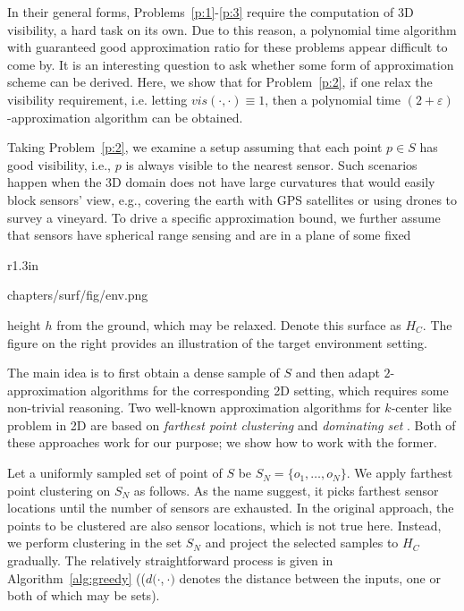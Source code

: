 
In their general forms, Problems~\ref{p:1}-\ref{p:3} require the computation of 3D visibility, a hard task on its own. Due to this reason, a polynomial time algorithm with guaranteed good approximation ratio for these problems appear difficult to come by. It is an interesting question to ask whether some form of approximation scheme can be derived. Here, we show that for Problem~\ref{p:2}, if one relax the visibility requirement, i.e. letting $vis(\cdot, \cdot)\equiv 1$, then a polynomial time $(2+\varepsilon)$-approximation algorithm can be obtained. 

Taking Problem~\ref{p:2}, we examine a setup assuming that each point $p \in S$ has good visibility, i.e., $p$ is always visible to the nearest sensor. Such scenarios happen when the 3D domain does not have large curvatures that would easily block sensors' view, e.g., covering the earth with GPS satellites or using drones to survey a vineyard. To drive a specific approximation bound, 
we further assume that sensors have spherical range sensing and are in a plane of some fixed 
\begin{wrapfigure}[5]{r}{1.3in}
  \vspace*{0mm}
  \begin{overpic}[width=1.3in,tics=5]{chapters/surf/fig/env.png}
	\end{overpic}
\vspace*{-6.5mm}
\end{wrapfigure}
height $h$ from the ground, which may be relaxed. Denote this surface as $H_C$. 
The figure on the right provides an illustration of the target environment setting. 

The main idea is to first obtain a dense sample of $S$ and then adapt $2$-approximation algorithms for the corresponding 2D setting, which requires some non-trivial reasoning. Two well-known approximation algorithms for $k$-center like problem in 2D are based on \emph{farthest point clustering} \cite{gonzalez1985clustering} and \emph{dominating set} \cite{hochbaum1985best, vazirani2013approximation}. Both of these approaches work for our purpose; we show how to work with the former.

Let a uniformly sampled set of point of $S$ be $S_N = \{o_1, \ldots, o_N\}$. We apply farthest point clustering \cite{gonzalez1985clustering} on $S_N$ as follows. As the name suggest, it picks farthest sensor locations until the number of sensors are exhausted. In the original approach, the points to be clustered are also sensor locations, which is not true here. Instead, we perform clustering in the set $S_N$ and project the selected samples to $H_C$ gradually. The relatively straightforward process is given in Algorithm~\ref{alg:greedy} (($d(\cdot$,$\ \cdot)$ denotes the distance between the inputs, one or both of which may be sets).


